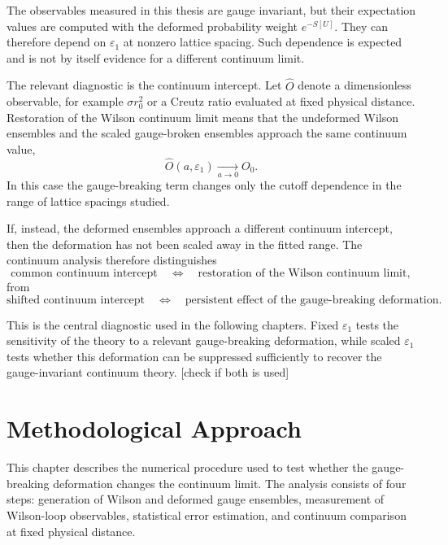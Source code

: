 \documentclass[12pt,a4paper,oneside,numbers=noenddot]{scrreprt}
\newcommand{\eps}{\varepsilon}
\newcommand{\latspacing}{a}
\newcommand{\rzero}{r_0}
\newcommand{\stringtension}{\sigma}
\begin{document}
The observables measured in this thesis are gauge invariant, but their
expectation values are computed with the deformed probability weight
\(e^{-S[U]}\). They can therefore depend on \(\eps_1\) at nonzero lattice
spacing. Such dependence is expected and is not by itself evidence for a
different continuum limit.

The relevant diagnostic is the continuum intercept. Let \(\hat O\) denote a
dimensionless observable, for example \(\stringtension\rzero^2\) or a Creutz
ratio evaluated at fixed physical distance. Restoration of the Wilson
continuum limit means that the undeformed Wilson ensembles and the scaled
gauge-broken ensembles approach the same continuum value,
\begin{equation}
  \hat O(\latspacing,\eps_1)
  \xrightarrow[\latspacing\to0]{}
  O_0 .
  \label{eq:common-continuum-limit-breaking}
\end{equation}
In this case the gauge-breaking term changes only the cutoff dependence in the
range of lattice spacings studied.

If, instead, the deformed ensembles approach a different continuum intercept,
then the deformation has not been scaled away in the fitted range. The
continuum analysis therefore distinguishes
\begin{equation}
  \text{common continuum intercept}
  \quad\Longleftrightarrow\quad
  \text{restoration of the Wilson continuum limit},
\end{equation}
from
\begin{equation}
  \text{shifted continuum intercept}
  \quad\Longleftrightarrow\quad
  \text{persistent effect of the gauge-breaking deformation}.
\end{equation}

This is the central diagnostic used in the following chapters. Fixed
\(\eps_1\) tests the sensitivity of the theory to a relevant gauge-breaking
deformation, while scaled \(\eps_1\) tests whether this deformation can be
suppressed sufficiently to recover the gauge-invariant continuum theory. [check if both is used]
\chapter{Methodological Approach}
\label{chap:methodology}
This chapter describes the numerical procedure used to test whether the
gauge-breaking deformation changes the continuum limit. The analysis consists
of four steps: generation of Wilson and deformed gauge ensembles, measurement
of Wilson-loop observables, statistical error estimation, and continuum
comparison at fixed physical distance.
\end{document}
